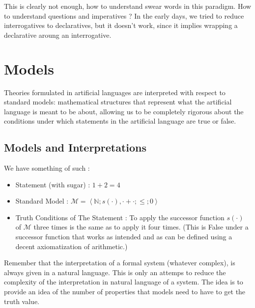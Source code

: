 \documentclass{cours}
\begin{document}
This is clearly not enough, how to understand swear words in this paradigm. How to understand questions and imperatives ? In the early days, we tried to reduce interrogatives to declaratives, but it doesn't work, since it implies wrapping a declarative aroung an interrogative. 

\section{Models}
Theories formulated in artificial languages are interpreted with respect to standard models: mathematical structures that represent what the artificial language is meant to be about, allowing us to be completely rigorous about the conditions under which statements in the artificial language are true or false.
\subsection{Models and Interpretations}
We have something of such : 
\begin{itemize}
    \item Statement (with sugar) : $1 + 2 = 4$
    \item Standard Model : $\mathcal{M} = \left\langle\mathbb{N}; s(\cdot), \cdot + \cdot;\leq;0\right\rangle$
    \item Truth Conditions of The Statement : To apply the successor function $s(\cdot)$ of $\mathcal{M}$ three times is the same as to apply it four times. (This is \textmd{False} under a successor function that works as intended and as can be defined using a decent axiomatization of arithmetic.)
\end{itemize}
Remember that the interpretation of a formal system (whatever complex), is always given in a natural language. This is only an attemps to reduce the complexity of the interpretation in natural language of a system. The idea is to provide an idea of the number of properties that models need to have to get the truth value.
\end{document}

